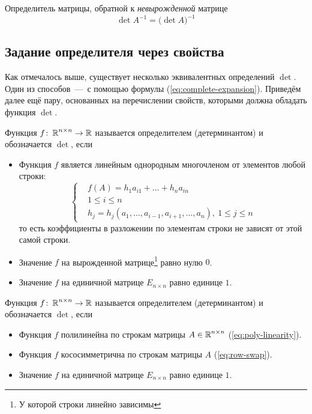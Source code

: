 \documentclass[a4paper,12pt]{article}
\begin{document}
  \begin{theorem}
    Определитель матрицы, обратной к \emph{невырожденной} матрице
    \[
      \det A^{-1} = \bigl(\det A\bigl)^{-1}
    \]
  \end{theorem}
  

  \subsection{Задание определителя через свойства}
  
  Как отмечалось выше, существует несколько эквивалентных определений $\det$.
  Один из способов~---~с помощью формулы (\ref{eq:complete-expansion}).
  Приведём далее ещё пару, основанных на перечислении свойств, которыми должна обладать функция $\det$.
  
  \begin{definition}
    Функция $f \colon \operatorname{\mathbb R}^{n \times n} \to \operatorname{\mathbb R}$ называется определителем (детерминантом) и обозначается $\det$, если
    \begin{itemize}
      \item Функция $f$ является линейным однородным многочленом от элементов любой строки:
      \[
        \left\{
          \begin{aligned}
            &f(A) = h_1 a_{i1} + \ldots + h_n a_{in}\\
            &1 \leq i \leq n\\
            &h_j = h_j(a_1, \ldots, a_{i-1}, a_{i+1}, \ldots, a_{n}),\ 1 \leq j \leq n
          \end{aligned}
        \right.
      \]
      то есть коэффициенты в разложении по элементам строки не зависят от этой самой строки.
      
      \item Значение $f$ на вырожденной матрице\footnote{У которой строки линейно зависимы} равно нулю $0$.
      \item Значение $f$ на единичной матрице $E_{n \times n}$ равно единице $1$.
    \end{itemize}
  \end{definition}
  
  \begin{definition}
    Функция $f \colon \operatorname{\mathbb R}^{n \times n} \to \operatorname{\mathbb R}$ называется определителем (детерминантом) и обозначается $\det$, если
    \begin{itemize}
      \item Функция $f$ полилинейна по строкам матрицы $A \in \operatorname{\mathbb R}^{n \times n}$ (\ref{eq:poly-linearity}).
      \item Функция $f$ кососимметрична по строкам матрицы $A$ (\ref{eq:row-swap}).
      \item Значение $f$ на единичной матрице $E_{n \times n}$ равно единице $1$.
    \end{itemize}
  \end{definition}
  
\end{document}
